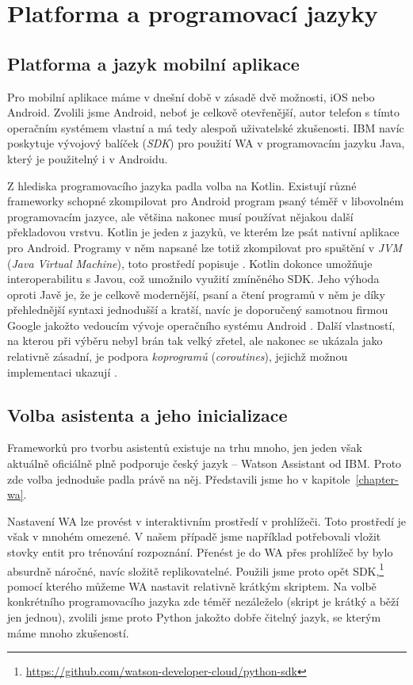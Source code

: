 \section{Platforma a programovací jazyky}\label{analysis}

\subsection{Platforma a jazyk mobilní aplikace}
Pro mobilní aplikace máme v dnešní době v zásadě dvě možnosti, iOS nebo Android.
Zvolili jsme Android, neboť je celkově otevřenější, autor telefon s tímto
operačním systémem vlastní a má tedy alespoň uživatelské zkušenosti. IBM navíc
poskytuje vývojový balíček (\textit{SDK}) pro použití WA v programovacím
jazyku Java, který je použitelný i v Androidu.

Z hlediska programovacího jazyka padla volba na Kotlin. Existují různé frameworky
schopné zkompilovat pro Android program psaný téměř v libovolném programovacím
jazyce, ale většina nakonec musí používat nějakou další překladovou vrstvu.
Kotlin je jeden z jazyků, ve kterém lze psát nativní aplikace pro Android. Programy
v něm napsané lze totiž zkompilovat pro spuštění v \textit{JVM} (\textit{Java Virtual Machine}),
toto prostředí popisuje \citet{prof_tejinder_singh_hotspot_2014}.
Kotlin dokonce umožňuje interoperabilitu s Javou, což umožnilo
využití zmíněného SDK. Jeho výhoda oproti Javě je, že je celkově modernější,
psaní a čtení programů v něm je díky přehlednější syntaxi jednodušší a kratší,
navíc je doporučený samotnou firmou Google jakožto vedoucím vývoje operačního
systému Android \citep{android_blog}.
Další vlastností, na kterou při výběru nebyl brán tak velký
zřetel, ale nakonec se ukázala jako relativně zásadní, je podpora \textit{koprogramů}
(\textit{coroutines}), jejichž možnou implementaci ukazují \citet{theory_practice_coroutines}.

\subsection{Volba asistenta a jeho inicializace}
Frameworků pro tvorbu asistentů existuje na trhu mnoho, jen jeden však aktuálně oficiálně plně
podporuje český jazyk -- Watson Assistant od IBM. Proto zde volba jednoduše
padla právě na něj. Představili jsme ho v kapitole~\ref{chapter-wa}.

Nastavení WA lze provést v interaktivním prostředí v prohlížeči. Toto
prostředí je však v mnohém omezené. V našem případě jsme například potřebovali
vložit stovky entit pro trénování rozpoznání. Přenést je do WA přes prohlížeč
by bylo absurdně náročné, navíc složitě replikovatelné. Použili jsme proto opět
SDK,\footnote{\url{https://github.com/watson-developer-cloud/python-sdk}} pomocí
kterého můžeme WA nastavit relativně krátkým skriptem. Na volbě
konkrétního programovacího jazyka zde téměř nezáleželo (skript je krátký a běží
jen jednou), zvolili jsme proto Python jakožto dobře čitelný
jazyk, se kterým máme mnoho zkušeností.

